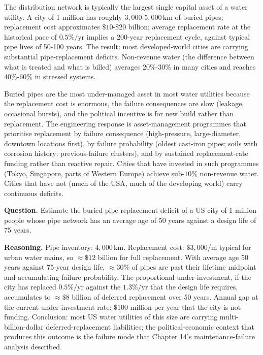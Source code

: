 The distribution network is typically the largest single capital asset of a water utility. A city of 1 million has roughly $3{,}000$-$5{,}000\,\text{km}$ of buried pipes; replacement cost approximates $\$10$-$\$20$ billion; average replacement rate at the historical pace of $0.5\%/\text{yr}$ implies a 200-year replacement cycle, against typical pipe lives of 50-100 years. The result: most developed-world cities are carrying substantial pipe-replacement deficits. Non-revenue water (the difference between what is treated and what is billed) averages $20\%$-$30\%$ in many cities and reaches $40\%$-$60\%$ in stressed systems.

\begin{principle}
Buried pipes are the most under-managed asset in most water utilities because the replacement cost is enormous, the failure consequences are slow (leakage, occasional bursts), and the political incentive is for new build rather than replacement. The engineering response is asset-management programmes that prioritise replacement by failure consequence (high-pressure, large-diameter, downtown locations first), by failure probability (oldest cast-iron pipes; soils with corrosion history; previous-failure clusters), and by sustained replacement-rate funding rather than reactive repair. Cities that have invested in such programmes (Tokyo, Singapore, parts of Western Europe) achieve sub-$10\%$ non-revenue water. Cities that have not (much of the USA, much of the developing world) carry continuous deficits.
\end{principle}

\begin{estimation}
\textbf{Question.} Estimate the buried-pipe replacement deficit of a US city of 1 million people whose pipe network has an average age of 50 years against a design life of 75 years.

\textbf{Reasoning.} Pipe inventory: $4{,}000\,\text{km}$. Replacement cost: $\$3{,}000$/m typical for urban water mains, so $\approx \$12$ billion for full replacement. With average age 50 years against 75-year design life, $\approx 30\%$ of pipes are past their lifetime midpoint and accumulating failure probability. The proportional under-investment, if the city has replaced $0.5\%/\text{yr}$ against the $1.3\%/\text{yr}$ that the design life requires, accumulates to $\approx \$8$ billion of deferred replacement over 50 years. Annual gap at the current under-investment rate: $\$100$ million per year that the city is not funding. Conclusion: most US water utilities of this size are carrying multi-billion-dollar deferred-replacement liabilities; the political-economic context that produces this outcome is the failure mode that Chapter 14's maintenance-failure analysis described.
\end{estimation}

